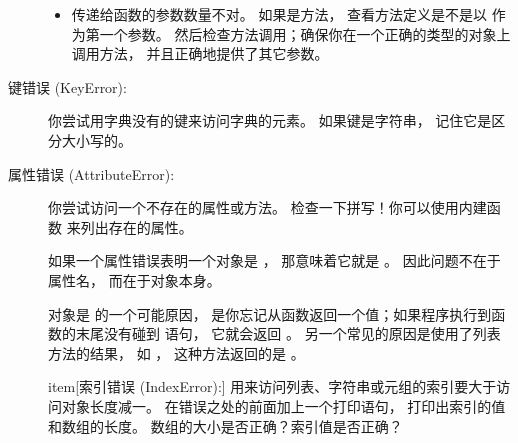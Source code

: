 \begin{description}
\begin{itemize}
\item 传递给函数的参数数量不对。  如果是方法， 查看方法定义是不是以  作为第一个参数。  然后检查方法调用；确保你在一个正确的类型的对象上调用方法， 并且正确地提供了其它参数。  

\end{itemize}


\item[键错误 (KeyError):]  你尝试用字典没有的键来访问字典的元素。  如果键是字符串， 记住它是区分大小写的。  


\item[属性错误 (AttributeError):]  你尝试访问一个不存在的属性或方法。  检查一下拼写！你可以使用内建函数  来列出存在的属性。  



如果一个属性错误表明一个对象是  ， 那意味着它就是  。  因此问题不在于属性名， 而在于对象本身。  


对象是  的一个可能原因， 是你忘记从函数返回一个值；如果程序执行到函数的末尾没有碰到  语句， 它就会返回  。  另一个常见的原因是使用了列表方法的结果， 如  ， 这种方法返回的是  。  


item[索引错误 (IndexError):]  用来访问列表、字符串或元组的索引要大于访问对象长度减一。  在错误之处的前面加上一个打印语句， 打印出索引的值和数组的长度。  数组的大小是否正确？索引值是否正确？

\end{description}

